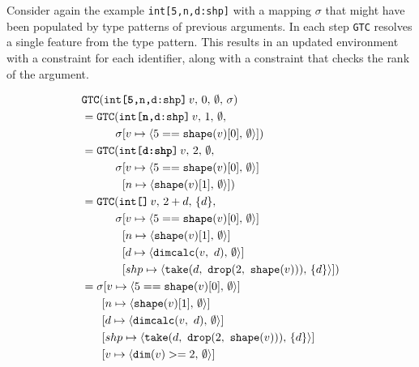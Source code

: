 \documentclass[sigconf,screen]{acmart}
\newcommand{\gtc}[4]{\ensuremath{\texttt{GTC}(#1\,v,\,#2,\,#3,\,#4)}}
\newcommand{\cenv}{\ensuremath{\sigma{}}}
\newcommand{\envmap}[3]{\ensuremath{[#1\mapsto\langle{}#3,\,#2\rangle{}]}}
\begin{document}
Consider again the example \texttt{int[5,n,d:shp]} with a mapping \cenv{} that might have been populated by type patterns of previous arguments.
In each step \texttt{GTC} resolves a single feature from the type pattern.
This results in an updated environment with a constraint for each identifier, along with a constraint that checks the rank of the argument.

{\allowdisplaybreaks
\begin{align*}
    &\gtc{\texttt{int[\textbf{5},n,d:shp]}}{0}{\emptyset}{\cenv} \\
    &= \gtc{\texttt{int[\textbf{n},d:shp]}}{1}{\emptyset}{
        \\ &\hspace{3em} \cenv
        \envmap{v}{\emptyset}{5 == \texttt{shape}(v)[0]}
    } \\
    &= \gtc{\texttt{int[\textbf{d:shp}]}}{2}{\emptyset}{
        \\ &\hspace{3em} \cenv
        \envmap{v}{\emptyset}{5 == \texttt{shape}(v)[0]}
        \\ &\hspace{3.6em}
        \envmap{n}{\emptyset}{\texttt{shape}(v)[1]}
    } \\
    &= \gtc{\texttt{int[]}}{2+d}{\{d\}}{
        \\ &\hspace{3em} \cenv
        \envmap{v}{\emptyset}{5 == \texttt{shape}(v)[0]}
        \\ &\hspace{3.6em}
        \envmap{n}{\emptyset}{\texttt{shape}(v)[1]}
        \\ &\hspace{3.6em}
        \envmap{d}{\emptyset}{\texttt{dimcalc}(v,\ d)}
        \\ &\hspace{3.6em}
        \envmap{shp}{\{d\}}{\texttt{take}(d,\ \texttt{drop}(2,\ \texttt{shape}(v)))}
    } \\
    &= \cenv
        \envmap{v}{\emptyset}{5 == \texttt{shape}(v)[0]}
        \\ &\hspace{1.8em}
        \envmap{n}{\emptyset}{\texttt{shape}(v)[1]}
        \\ &\hspace{1.8em}
        \envmap{d}{\emptyset}{\texttt{dimcalc}(v,\ d)}
        \\ &\hspace{1.8em}
        \envmap{shp}{\{d\}}{\texttt{take}(d,\ \texttt{drop}(2,\ \texttt{shape}(v)))}
        \\ &\hspace{1.8em}
        \envmap{v}{\emptyset}{\texttt{dim}(v) >= 2}
\end{align*}}
\end{document}
